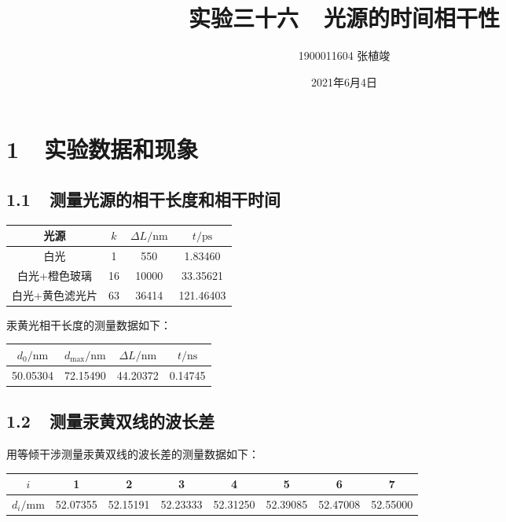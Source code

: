 \documentclass[a4paper,fontset=windows]{ctexart}
\begin{document}
\title{\textbf{实验三十六\ \ 光源的时间相干性}}
\author{1900011604 张植竣}
\date{2021年6月4日}

\maketitle

\section*{1\ \ 实验数据和现象}

\subsection*{1.1\ \ 测量光源的相干长度和相干时间}

\begin{table}[!ht]
    \centering
    \begin{tabular}{|c|c|c|c|}
        \hline
        光源 & $k$ & $\Delta L/\mathrm{nm}$ & $t/\mathrm{ps}$ \\
        \hline
        白光 & 1 & 550 & 1.83460 \\
        \hline
        白光+橙色玻璃 & 16 & 10000 & 33.35621 \\
        \hline
        白光+黄色滤光片 & 63 & 36414 & 121.46403 \\
        \hline
    \end{tabular}
\end{table}

汞黄光相干长度的测量数据如下：

\begin{table}[!ht]
    \centering
    \begin{tabular}{|c|c|c|c|}
        \hline
        $d_0/\mathrm{nm}$ & $d_{\mathrm{max}}/\mathrm{nm}$ & $\Delta L/\mathrm{nm}$ & $t/\mathrm{ns}$ \\
        \hline
        50.05304 & 72.15490 & 44.20372 & 0.14745 \\
        \hline
    \end{tabular}
\end{table}

\subsection*{1.2\ \ 测量汞黄双线的波长差}

用等倾干涉测量汞黄双线的波长差的测量数据如下：

\begin{table}[!ht]
    \centering
    \begin{tabular}{|c|c|c|c|c|c|c|c|}
        \hline
        $i$ & 1 & 2 & 3 & 4 & 5 & 6 & 7 \\
        \hline
        $d_i/\mathrm{mm}$ & 52.07355 & 52.15191 & 52.23333 & 52.31250 & 52.39085 & 52.47008 & 52.55000 \\
        \hline
    \end{tabular}
\end{table}
\end{document}

